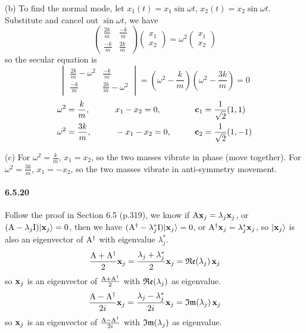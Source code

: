 \documentclass[a4paper]{article}
\begin{document}
(b)
To find the normal mode, let $x_1(t)=x_1\sin\omega t$,\; $x_2(t)=x_2\sin\omega t$. Substitute and cancel
out $\sin\omega t$, we have
\[
\begin{pmatrix}
\frac{2k}{m}&\frac{-k}{m}\\
\frac{-k}{m}&\frac{2k}{m}
\end{pmatrix}
\begin{pmatrix}
x_1\\x_2
\end{pmatrix}=\omega^2
\begin{pmatrix}
x_1\\x_2
\end{pmatrix}
\]
so the secular equation is 
\[
\begin{vmatrix}
\frac{2k}{m}-\omega^2&\frac{-k}{m}\\
\frac{-k}{m}&\frac{2k}{m}-\omega^2
\end{vmatrix}=
(\omega^2-\frac{k}{m})(\omega^2-\frac{3k}{m})=0
\]
\begin{alignat*}{3}
    & \omega^2=\frac{k}{m} ,\qquad && x_1-x_2=0,\qquad && \mathbf{c}_1=\frac{1}{\sqrt{2}}(1,1) \\
    & \omega^2=\frac{3k}{m} ,\qquad && -x_1-x_2=0,\qquad && \mathbf{c}_2=\frac{1}{\sqrt{2}}(1,-1) \\
\end{alignat*}

(c) For $\omega^2=\frac{k}{m}$, $x_1=x_2$, so the two masses vibrate in phase (move together). For $\omega^2=\frac{3k}{m}$, $x_1=-x_2$, so the two masses vibrate in anti-symmetry movement.

\paragraph{6.5.20}
Follow the proof in Section 6.5 (p.319), we know if $\mathrm{A}\mathbf{x}_j=\lambda_j\mathbf{x}_j$, or $(\mathrm{A}-\lambda_j\mathrm{I})|\mathbf{x}_j\rangle=0$, then we have $(\mathrm{A}^\dagger-\lambda_j^*\mathrm{I})|\mathbf{x}_j\rangle=0$, or $\mathrm{A}^\dagger\mathbf{x}_j=\lambda_j^*\mathbf{x}_j$, so $|\mathbf{x}_j\rangle$ is also an eigenvector of $\mathrm{A}^\dagger$ with eigenvalue $\lambda_j^*$.
\[
\frac{\mathrm{A}+\mathrm{A}^\dagger}{2}\mathbf{x}_j=\frac{\lambda_j+\lambda_j^*}{2}\mathbf{x}_j=\mathfrak{Re}(\lambda_j)\,\mathbf{x}_j
\]
so $\mathbf{x}_j$ is an eigenvector of $\frac{\mathrm{A}+\mathrm{A}^\dagger}{2}$ with $\mathfrak{Re}(\lambda_j)$ as eigenvalue.
\[
\frac{\mathrm{A}-\mathrm{A}^\dagger}{2i}\mathbf{x}_j=\frac{\lambda_j-\lambda_j^*}{2i}\mathbf{x}_j=\mathfrak{Im}(\lambda_j)\,\mathbf{x}_j
\]
so $\mathbf{x}_j$ is an eigenvector of $\frac{\mathrm{A}-\mathrm{A}^\dagger}{2i}$ with $\mathfrak{Im}(\lambda_j)$ as eigenvalue.
\end{document}
